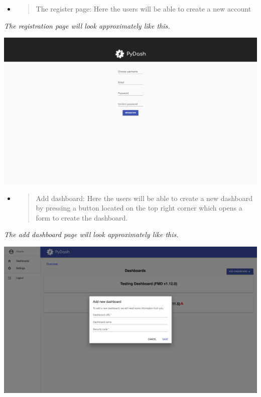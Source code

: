 \begin{itemize}
\item
  \begin{quote}
  The register page: Here the users will be able to create a new account
  \end{quote}
\end{itemize}

\emph{The registration page will look approximately like
this.}

\includegraphics[width=\pagewidth]{media/image40.png}

\begin{itemize}
\item
  \begin{quote}
  Add dashboard: Here the users will be able to create a new dashboard
  by pressing a button located on the top right corner which opens a
  form to create the dashboard.
  \end{quote}
\end{itemize}

\emph{The add dashboard page will look approximately like this.}

\includegraphics[width=\pagewidth]{media/image25.png}

